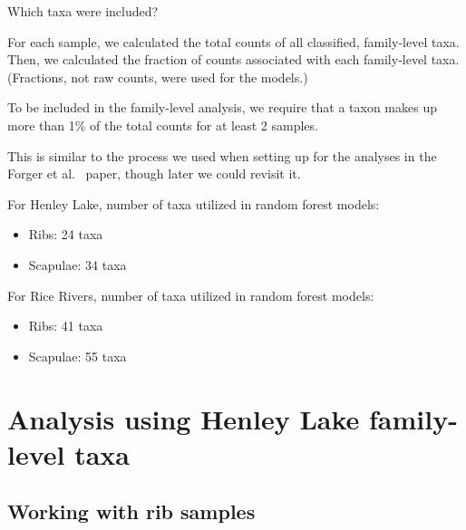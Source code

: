 \documentclass{beamer}
\begin{document}
\begin{frame}{Which taxa were included?}

  {\footnotesize
  \noindent For each sample, we calculated the total counts of all
  classified, family-level taxa.  Then, we calculated the fraction of
  counts associated with each family-level taxa.  (Fractions, not raw
  counts, were used for the models.)

  \vspace{0.1in}

  \noindent To be included in the family-level analysis, we require that a taxon
  makes up more than 1\% of the total counts for at least 2 samples.

  \vspace{0.1in}

  \noindent This is similar to the process we used when setting up for
  the analyses in the Forger et al.~ paper, though later we could
  revisit it.

  \vspace{0.1in}

  \noindent For Henley Lake, number of taxa utilized in random forest models:
  \begin{itemize}
    \item Ribs: 24 taxa
    \item Scapulae: 34 taxa
  \end{itemize}

  \vspace{0.1in}
  
  \noindent For Rice Rivers, number of taxa utilized in random forest models:
  \begin{itemize}
    \item Ribs: 41 taxa
    \item Scapulae: 55 taxa
  \end{itemize}
}

\end{frame}




\section[Henley Lake]{Analysis using Henley Lake family-level taxa}


\subsection[Ribs]{Working with rib samples}
\end{document}
